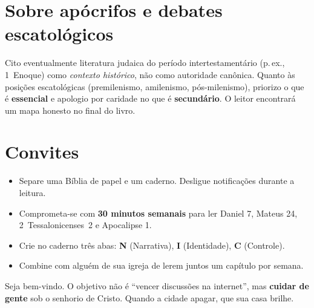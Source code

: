 \section*{Sobre apócrifos e debates escatológicos}
Cito eventualmente literatura judaica do período intertestamentário (p.\,ex., 1~Enoque) como \textit{contexto histórico}, não como autoridade canônica. Quanto às posições escatológicas (premilenismo, amilenismo, pós-milenismo), priorizo o que é \textbf{essencial} e apologio por caridade no que é \textbf{secundário}. O leitor encontrará um mapa honesto no final do livro.

\section*{Convites}
\begin{checklist}[title={Antes de começar}]
\begin{itemize}[leftmargin=*,noitemsep]
  \item Separe uma Bíblia de papel e um caderno. Desligue notificações durante a leitura.
  \item Comprometa-se com \textbf{30 minutos semanais} para ler Daniel 7, Mateus 24, 2~Tessalonicenses~2 e Apocalipse 1.
  \item Crie no caderno três abas: \textbf{N} (Narrativa), \textbf{I} (Identidade), \textbf{C} (Controle).
  \item Combine com alguém de sua igreja de lerem juntos um capítulo por semana.
\end{itemize}
\end{checklist}

Seja bem-vindo. O objetivo não é “vencer discussões na internet”, mas \textbf{cuidar de gente} sob o senhorio de Cristo. Quando a cidade apagar, que sua casa brilhe.
